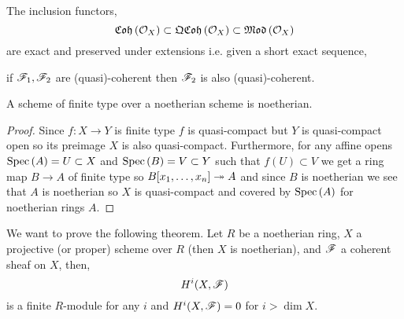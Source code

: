 \documentclass[12pt]{article}
\begin{document}
\begin{remark}
The inclusion functors,
\[ \mathfrak{Coh}\left(\mathcal{O}_{X}\right) \subset \mathfrak{QCoh}\left(\mathcal{O}_{X}\right) \subset \mathfrak{Mod}\left(\mathcal{O}_{X}\right) \]
are exact and preserved under extensions i.e. given a short exact sequence,
\begin{center}
\end{center}
if $\mathscr{F}_1, \mathscr{F}_2$ are (quasi)-coherent  then $\mathscr{F}_2$ is also (quasi)-coherent. 
\end{remark}

\begin{lemma}
A scheme of finite type over a noetherian scheme is noetherian.
\end{lemma}

\begin{proof}
Since $f : X \to Y$ is finite type $f$ is quasi-compact but $Y$ is quasi-compact open so its preimage $X$ is also quasi-compact. Furthermore, for any affine opens $\mathrm{Spec}\left( A \right) = U \subset X$ and $\mathrm{Spec}\left( B \right) = V \subset Y$ such that $f(U) \subset V$ we get a ring map $B \to A$ of finite type so $B[x_1, \dots, x_n] \twoheadrightarrow A$ and since $B$ is noetherian we see that $A$ is noetherian so $X$ is quasi-compact and covered by $\mathrm{Spec}\left( A \right)$ for noetherian rings $A$. 
\end{proof}

\begin{remark}
We want to prove the following theorem. Let $R$ be a noetherian ring, $X$ a projective (or proper) scheme over $R$ (then $X$ is noetherian), and $\mathscr{F}$ a coherent sheaf on $X$, then,
\[ H^i(X, \mathscr{F}) \]
is a finite $R$-module for any $i$ and $H^i(X, \mathscr{F}) = 0$ for $i > \dim{X}$. 
\end{remark}
\end{document}
